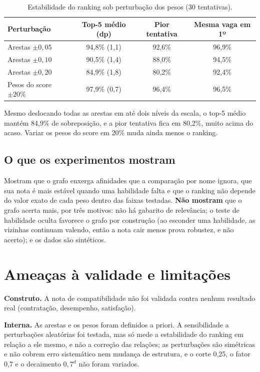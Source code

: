 \documentclass[12pt]{article}
\begin{document}
\begin{table}[ht]
\centering
\caption{Estabilidade do ranking sob perturbação dos pesos (30 tentativas).}
\label{tab:sens}
\begin{tabular}{lccc}
\hline
Perturbação & Top-5 médio (dp) & Pior tentativa & Mesma vaga em 1º \\
\hline
Arestas $\pm 0{,}05$ & 94,8\% (1,1) & 92,6\% & 96,9\% \\
Arestas $\pm 0{,}10$ & 90,5\% (1,4) & 88,0\% & 94,5\% \\
Arestas $\pm 0{,}20$ & 84,9\% (1,8) & 80,2\% & 92,4\% \\
Pesos do score $\pm 20\%$ & 97,9\% (0,7) & 96,4\% & 96,5\% \\
\hline
\end{tabular}
\end{table}

Mesmo deslocando todas as arestas em até dois níveis da escala, o top-5 médio mantém 84,9\% de sobreposição, e a pior tentativa fica em 80,2\%, muito acima do acaso. Variar os pesos do score em 20\% muda ainda menos o ranking.

\subsection{O que os experimentos mostram}

Mostram que o grafo enxerga afinidades que a comparação por nome ignora, que sua nota é mais estável quando uma habilidade falta e que o ranking não depende do valor exato de cada peso dentro das faixas testadas. \textbf{Não mostram} que o grafo acerta mais, por três motivos: não há gabarito de relevância; o teste de habilidade oculta favorece o grafo por construção (ao esconder uma habilidade, as vizinhas continuam valendo, então a nota cair menos prova robustez, e não acerto); e os dados são sintéticos.

\section{Ameaças à validade e limitações}
\label{sec:lim}

\textbf{Construto.} A nota de compatibilidade não foi validada contra nenhum resultado real (contratação, desempenho, satisfação).

\textbf{Interna.} As arestas e os pesos foram definidos a priori. A sensibilidade a perturbações aleatórias foi testada, mas só mede a estabilidade do ranking em relação a ele mesmo, e não a correção das relações; as perturbações são simétricas e não cobrem erro sistemático nem mudança de estrutura, e o corte 0,25, o fator 0,7 e o decaimento $0{,}7^{d}$ não foram variados.
\end{document}
